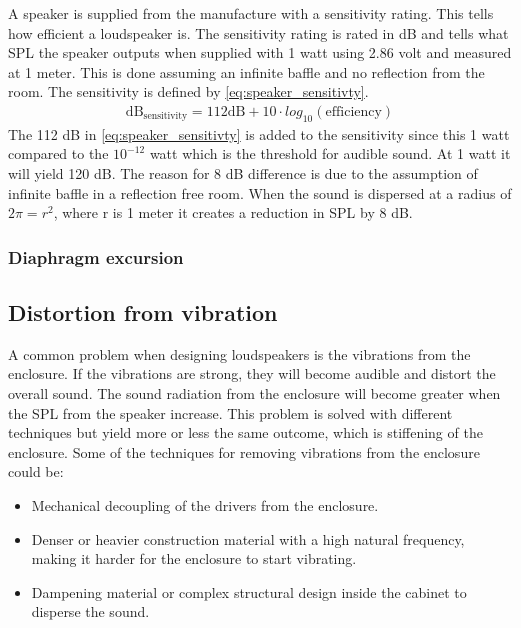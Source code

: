 A speaker is supplied from the manufacture with a sensitivity rating. This tells how efficient a loudspeaker is. The sensitivity rating is rated in dB and tells what \gls{SPL} the speaker outputs when supplied with 1 watt using 2.86 volt and measured at 1 meter. This is done assuming an infinite baffle and no reflection from the room. The sensitivity is defined by \autoref{eq:speaker_sensitivty}.
\begin{align}\label{eq:speaker_sensitivty}
\text{dB}_\text{sensitivity}=112\text {dB} +10 \cdot log_{10}(\text{efficiency})
\end{align}  
The 112 dB in \autoref{eq:speaker_sensitivty} is added to the sensitivity since this 1 watt compared to the $10^{-12}$ watt which is the threshold for audible sound. At 1 watt it will yield 120 dB. The reason for 8 dB difference is due to the assumption of infinite baffle in a reflection free room. When the sound is dispersed at a radius of $2\pi=r^2$, where r is 1 meter it creates a reduction in \gls{SPL} by 8 dB.

\subsubsection*{Diaphragm excursion}




\subsection{Distortion from vibration}

A common problem when designing loudspeakers is the vibrations from the enclosure. If the vibrations are strong, they will become audible and distort the overall sound. The sound radiation from the enclosure will become greater when the \gls{SPL} from the speaker increase. This problem is solved with different techniques but yield more or less the same outcome, which is stiffening of the enclosure. Some of the techniques for removing vibrations from the enclosure could be:
\begin{itemize}
\item Mechanical decoupling of the drivers from the enclosure.
\item Denser or heavier construction material with a high natural frequency, making it harder for the enclosure to start vibrating.
\item Dampening material or complex structural design inside the cabinet to disperse the sound.
\end{itemize}


